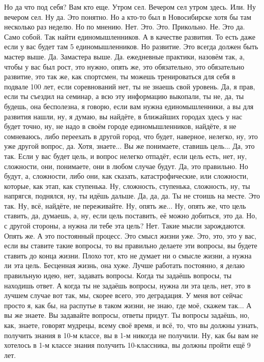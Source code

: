 Но да что под себя?
Вам кто еще.
Утром сел.
Вечером сел утром здесь.
Или.
Ну вечером сел.
Ну да.
Это понятно.
Но а кто-то был в Новосибирске хотя бы там несколько раз
неделю.
Но по мнению.
Нет.
Это.
Это.
Прикольно.
Не.
Это да.
Само собой.
Так найти единомышленников.
А в качестве развития.
То есть даже если у вас будет там 5 единомышленников.
Но развитие.
Это всегда должен быть мастер выше.
Да.
Замастера выше.
Да.
ежедневные практики, назовём так, а, чтобы у вас был рост, это нужно, опять же, это обязательно, это обязательно развитие, это так же, как спортсмен, ты можешь тренироваться для себя в подвале 100 лет, если соревнований нет, ты не знаешь свой уровень.
Да, я прав, если ты съездил на семинар, а всю эту информацию выкопали, ты не, да, ты будешь, она бесполезна, я говорю, если вам нужна единомышленники, а вы для развития нашли, ну, я думаю, вы найдёте, в ближайших городах здесь у нас будет точно, ну, не надо в своём городе единомышленников, найдёте, я не сомневаюсь, либо переехать в другой город, что будет, наверное, нелегко, ну, это уже другой вопрос, да.
Хотя, знаете...
Вы же понимаете, ставишь цель...
Да, это так.
Если у вас будет цель, и вопрос нелегко отпадёт, если цель есть, нет, ну, сложности, они, понимаете, они в любом случае будут.
Да, это правильно.
Но будут, а, сложности, либо они, как сказать, катастрофические, или сложности, которые, как этап, как ступенька.
Ну, сложность, ступенька, сложность, ну, ты напрягся, поднялся, ну, ты идёшь дальше.
Да, да, да.
Ты не стоишь на месте.
Это так.
Ну, всё, найдёте, не переживайте.
Ну, опять же...
Ну, опять же, что цель ставить, да, думаешь, а, ну, если цель поставить, её можно добиться, это да.
Но, с другой стороны, а нужна ли тебе эта цель?
Нет.
Такие мысли зарождаются.
Опять же.
А это постоянный процесс.
Это смысл жизни уже.
Это, это, это у вас, если вы ставите такие вопросы, то вы правильно делаете эти вопросы, вы будете ставить до конца жизни.
Плохо тот, кто не думает ни о смысле жизни, а нужна ли эта цель.
Бесценная жизнь, она хуже.
Лучше работать постоянно, я делаю правильную идею, нет, задавать вопросы.
Когда ты задаёшь вопросы, ты находишь ответ.
А когда ты не задаёшь вопросы, нужна ли эта цель, нет, это в лучшем случае вот так, мы, скорее всего, это деградация.
У меня вот сейчас просто я, как бы, на распутье в таком жизни, не знаю, где моё, скажем так...
А вы же знаете.
Вы задавайте вопросы, ответы придут.
Ты вопросы задаёшь, но, как, знаете, говорят мудрецы, всему своё время, и всё, то, что вы должны узнать, получить знания в 10-м классе, вы в 1-м никогда не получили.
Ну, как бы вам не хотелось в 1-м классе знания получить 10-классника, вы должны пройти ещё 9 лет.
